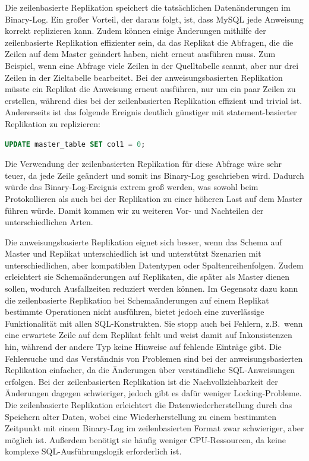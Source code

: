 Die zeilenbasierte Replikation speichert die tatsächlichen Datenänderungen im Binary-Log.
Ein großer Vorteil, der daraus folgt, ist, dass MySQL jede Anweisung korrekt replizieren kann.
Zudem können einige Änderungen mithilfe der zeilenbasierte Replikation effizienter sein, da das Replikat die Abfragen, die die Zeilen auf dem Master geändert haben, nicht erneut ausführen muss.
Zum Beispiel, wenn eine Abfrage viele Zeilen in der Quelltabelle scannt, aber nur drei Zeilen in der Zieltabelle bearbeitet.
Bei der anweisungsbasierten Replikation müsste ein Replikat die Anweisung erneut ausführen, nur um ein paar Zeilen zu erstellen, während dies bei der zeilenbasierten Replikation effizient und trivial ist.
Andererseits ist das folgende Ereignis deutlich günstiger mit statement-basierter Replikation zu replizieren:

\vspace{-5pt}
\begin{lstlisting}[language=SQL]
UPDATE master_table SET col1 = 0;
\end{lstlisting}
\vspace{-5pt}

Die Verwendung der zeilenbasierten Replikation für diese Abfrage wäre sehr teuer, da jede Zeile geändert und somit ins Binary-Log geschrieben wird.
Dadurch würde das Binary-Log-Ereignis extrem groß werden, was sowohl beim Protokollieren als auch bei der Replikation zu einer höheren Last auf dem Master führen würde.
Damit kommen wir zu weiteren Vor- und Nachteilen der unterschiedlichen Arten.

Die anweisungsbasierte Replikation eignet sich besser, wenn das Schema auf Master und Replikat unterschiedlich ist und unterstützt Szenarien mit unterschiedlichen, aber kompatiblen Datentypen oder Spaltenreihenfolgen.
Zudem erleichtert sie Schemaänderungen auf Replikaten, die später als Master dienen sollen, wodurch Ausfallzeiten reduziert werden können.
Im Gegensatz dazu kann die zeilenbasierte Replikation bei Schemaänderungen auf einem Replikat bestimmte Operationen nicht ausführen, bietet jedoch eine zuverlässige Funktionalität mit allen SQL-Konstrukten.
Sie stopp auch bei Fehlern, z.B.\ wenn eine erwartete Zeile auf dem Replikat fehlt und weist damit auf Inkonsistenzen hin, während der andere Typ keine Hinweise auf fehlende Einträge gibt.
Die Fehlersuche und das Verständnis von Problemen sind bei der anweisungsbasierten Replikation einfacher, da die Änderungen über verständliche SQL-Anweisungen erfolgen.
Bei der zeilenbasierten Replikation ist die Nachvollziehbarkeit der Änderungen dagegen schwieriger, jedoch gibt es dafür weniger Locking-Probleme.
Die zeilenbasierte Replikation erleichtert die Datenwiederherstellung durch das Speichern alter Daten, wobei eine Wiederherstellung zu einem bestimmten Zeitpunkt mit einem Binary-Log im zeilenbasierten Format zwar schwieriger, aber möglich ist.
Außerdem benötigt sie häufig weniger CPU-Ressourcen, da keine komplexe SQL-Ausführungslogik erforderlich ist.

